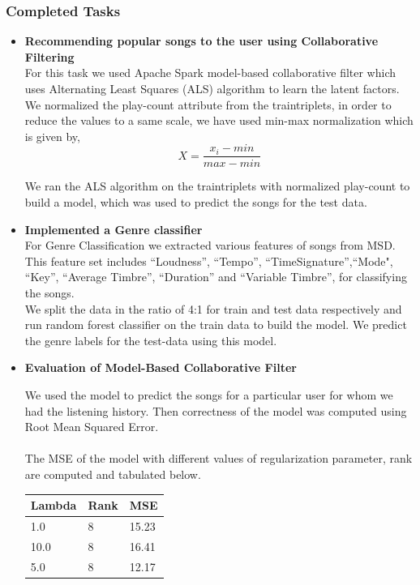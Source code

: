 \documentclass{sig-alternate-05-2015}
\begin{document}
\subsubsection{Completed Tasks}
\begin{itemize}
    \item \textbf{Recommending popular songs to the user using Collaborative Filtering}\\
    For this task we used Apache Spark model-based collaborative filter which uses Alternating Least Squares (ALS) algorithm to learn the latent factors. We normalized the play-count attribute from the traintriplets, in order to reduce the values to a same scale, we have used min-max normalization which is given by,
    \begin{equation*}
        X = \frac{x_i-min}{max-min}
    \end{equation*}
    
    We ran the ALS algorithm on the traintriplets with normalized play-count to build a model, which was used to predict the songs for the test data.
    
    \item \textbf{Implemented a Genre classifier}\\
    For Genre Classification we extracted various features of songs from MSD. This feature set includes ``Loudness'', ``Tempo'', ``TimeSignature'',``Mode", ``Key'', ``Average Timbre'', ``Duration'' and ``Variable Timbre'', for classifying the songs.\\
    
    We split the data in the ratio of 4:1 for train and test data respectively and run random forest classifier on the train data to build the model. We predict the genre labels for the test-data using this model.
    
    
    \item \textbf{Evaluation of Model-Based Collaborative Filter}
    
    We used the model to predict the songs for a particular user for whom we had the listening history. Then correctness of the model was computed using Root Mean Squared Error. \\\\
    The MSE of the model with different values of regularization parameter, rank are computed and
    tabulated below.
    
    
\begin{center}
\begin{tabular} { |p{2cm}|p{2cm}|p{2cm}| } 
\hline \textbf{Lambda} & \textbf{Rank} &\textbf{MSE} \\
\hline 1.0 & 8 & 15.23 \\
\hline 10.0 & 8 & 16.41 \\
\hline 5.0 & 8 & 12.17 \\
\hline
\end{tabular}
\end{center}


\end{itemize}
\end{document}

